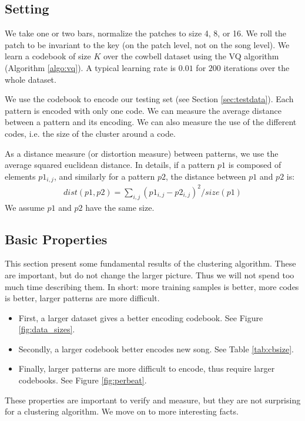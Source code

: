 \documentclass{article}
\begin{document}
\subsection{Setting}\label{ssec:setting}
We take one or two bars, normalize the patches to size 4, 8, or 16.
We roll the patch to be invariant to the key (on the patch level, not on
the song level). We learn a codebook of size $K$ over the cowbell dataset 
using the VQ algorithm (Algorithm \ref{algo:vq}). A typical learning rate 
is $0.01$ for $200$ iterations over the whole dataset.

We use the codebook to encode our testing set (see Section \ref{sec:testdata}).
Each pattern is encoded with only one code. We can measure the average
distance between a pattern and its encoding. We can also measure the use
of the different codes, i.e. the size of the cluster around a code.

As a distance measure (or distortion measure) between patterns, we use
the average squared euclidean distance. In details, if a pattern $p1$
is composed of elements $p1_{i,j}$, and similarly for a pattern $p2$,
the distance between $p1$ and $p2$ is:
\begin{eqnarray}
  dist(p1,p2) = \sum_{i,j} (p1_{i,j} - p2_{i,j})^2 / size(p1)  \label{eq:dist}
\end{eqnarray}
We assume $p1$ and $p2$ have the same size.


\subsection{Basic Properties}
This section present some fundamental results of the clustering algorithm.
These are important, but do not change the larger picture. Thus we will not
spend too much time describing them. In short: more training samples is
better, more codes is better, larger patterns are more difficult.
\begin{itemize}
\item First, a larger dataset gives a better encoding codebook. See Figure
\ref{fig:data_sizes}.
\item Secondly, a larger codebook better encodes new song. See 
Table \ref{tab:cbsize}.
\item Finally, larger patterns are more difficult to encode, thus require
larger codebooks. See Figure \ref{fig:perbeat}.
\end{itemize}

These properties are important to verify and measure, but they are not
surprising for a clustering algorithm. We move on to more interesting facts.
\end{document}
